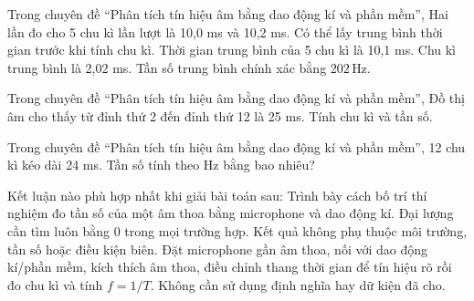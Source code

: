 \begin{ex}
Trong chuyên đề “Phân tích tín hiệu âm bằng dao động kí và phần mềm”, Hai lần đo cho 5 chu kì lần lượt là 10,0 ms và 10,2 ms.
\choiceTF
{\True Có thể lấy trung bình thời gian trước khi tính chu kì.}
{\True Thời gian trung bình của 5 chu kì là 10,1 ms.}
{\True Chu kì trung bình là 2,02 ms.}
{Tần số trung bình chính xác bằng $202\,\text{Hz}$.}
\end{ex}

\begin{ex}
Trong chuyên đề “Phân tích tín hiệu âm bằng dao động kí và phần mềm”, Đồ thị âm cho thấy từ đỉnh thứ 2 đến đỉnh thứ 12 là 25 ms. Tính chu kì và tần số.
\choiceTF

\end{ex}

\begin{ex}
Trong chuyên đề “Phân tích tín hiệu âm bằng dao động kí và phần mềm”, 12 chu kì kéo dài 24 ms. Tần số tính theo Hz bằng bao nhiêu?
\end{ex}

\begin{ex}
Kết luận nào phù hợp nhất khi giải bài toán sau: Trình bày cách bố trí thí nghiệm đo tần số của một âm thoa bằng microphone và dao động kí.
\choice
{Đại lượng cần tìm luôn bằng 0 trong mọi trường hợp.}
{Kết quả không phụ thuộc môi trường, tần số hoặc điều kiện biên.}
{\True Đặt microphone gần âm thoa, nối với dao động kí/phần mềm, kích thích âm thoa, điều chỉnh thang thời gian để tín hiệu rõ rồi đo chu kì và tính $f=1/T$.}
{Không cần sử dụng định nghĩa hay dữ kiện đã cho.}
\end{ex}

